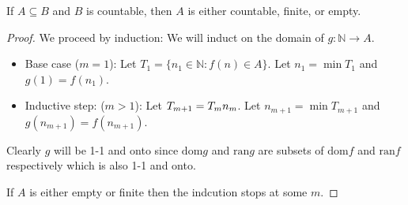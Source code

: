 \begin{theorem}
    If $A \subseteq B$ and $B$ is countable, then $A$ is either countable,
    finite, or empty.
\end{theorem}
\begin{proof}
    We proceed by induction: We will induct on the domain of $g: \mathbb{N} \rightarrow A$.
    
    \begin{itemize}
        \item 
        Base case ($m = 1$):
        Let $T_1 = \{ n_1 \in \mathbb{N} : f(n) \in A \}$. Let $n_1 = \min T_1$
        and $g(1) = f(n_1)$.

        \item 
        Inductive step: ($m > 1$): Let $T_{m+1} = T_m\\ n_m$. Let $n_{m+1} = \min T_{m+1}$
        and $g(n_{m+1}) = f(n_{m+1})$.
    \end{itemize}
    Clearly $g$ will be 1-1 and onto since $\text{dom} g$ and $\text{ran} g$ are 
    subsets of $\text{dom} f$ and $\text{ran} f$ respectively which is also 1-1 and onto.
    
    If $A$ is either empty or finite then the indcution stops at some $m$.
\end{proof}

